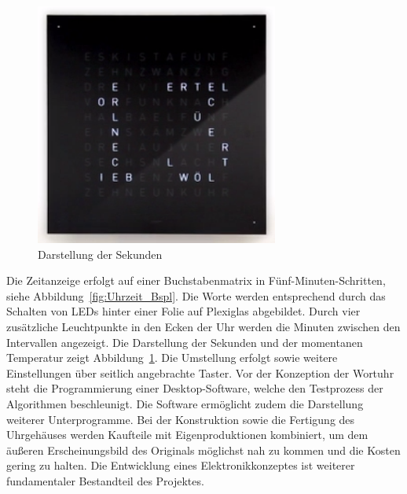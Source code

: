  \begin{figure}[t]
    \centering
    \includegraphics[width=8cm]{Abbildungen/Sekunden}
    \caption[Sekunden]{Darstellung der Sekunden}
    \label{fig:Sekunden}
\end{figure}
%
  \begin{multicols}{2}
 Die Zeitanzeige erfolgt auf einer Buchstabenmatrix in Fünf-Minuten-Schritten, siehe Abbildung~\ref{fig:Uhrzeit_Bspl}. Die Worte werden entsprechend durch das Schalten von LEDs hinter einer Folie auf Plexiglas abgebildet. Durch vier zusätzliche Leuchtpunkte in den Ecken der Uhr werden die Minuten zwischen den Intervallen angezeigt. Die Darstellung der Sekunden und der momentanen Temperatur zeigt Abbildung~\ref{fig:Sekunden}. Die Umstellung erfolgt sowie weitere Einstellungen über seitlich angebrachte Taster. Vor der Konzeption der Wortuhr steht die Programmierung einer Desktop-Software, welche den Testprozess der Algorithmen beschleunigt. Die Software ermöglicht zudem die Darstellung weiterer Unterprogramme. 
Bei der Konstruktion sowie die Fertigung des Uhrgehäuses werden Kaufteile mit Eigenproduktionen kombiniert, um dem äußeren Erscheinungsbild des Originals möglichst nah zu kommen und die Kosten gering zu halten. Die Entwicklung eines Elektronikkonzeptes ist  weiterer fundamentaler Bestandteil des Projektes.
\end{multicols}



